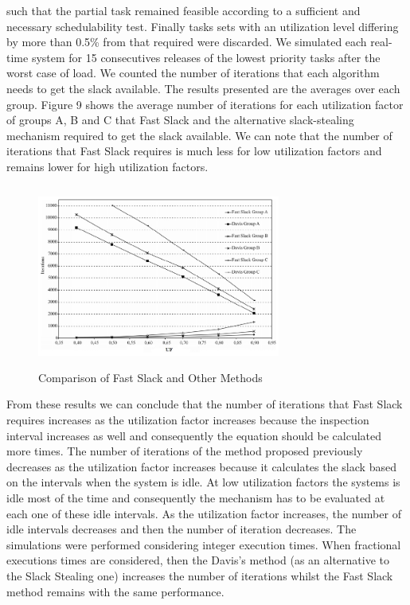 \documentclass[conference]{IEEEtran}
\begin{document}
such that the partial task remained feasible according to a sufficient and necessary schedulability test. Finally tasks
sets with an utilization level differing by more than 0.5\% from that required were discarded. We simulated each
real-time system for 15 consecutives releases of the lowest priority tasks after the worst case of load. We counted
the number of iterations that each algorithm needs to get the slack available. The results presented are the averages
over each group. 
Figure 9 shows the average number of iterations for each utilization factor of groups A, B and C that Fast Slack
and the alternative slack-stealing mechanism required to get the slack available. We can note that the number
of iterations that Fast Slack requires is much less for low utilization factors and remains lower for high utilization
factors.
\begin{figure}[h!]
	\includegraphics[width=8cm, height=6cm]{graph}
	\caption{Comparison of Fast Slack and Other Methods}
	\centering
\end{figure}
From these results we can conclude that the number of iterations that Fast Slack requires increases as the
utilization factor increases because the inspection interval increases as well and consequently the equation should be
calculated more times.
The number of iterations of the method proposed previously decreases as the utilization factor increases because it
calculates the slack based on the intervals when the system is idle. At low utilization factors the systems is idle most of the time and consequently the mechanism has to be evaluated at each one of these idle intervals. As the
utilization factor increases, the number of idle intervals decreases and then the number of iteration decreases.
The simulations were performed considering integer execution times. When fractional executions times are
considered, then the Davis’s method (as an alternative to the Slack Stealing one) increases the number of iterations whilst the Fast Slack method remains with
the same performance. 
\end{document}
